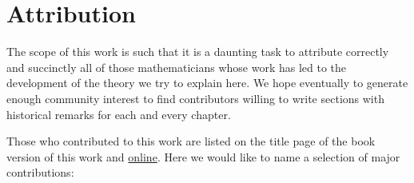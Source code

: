 \section{Attribution}
\label{section-attribution}

\noindent
The scope of this work is such that it is a daunting task to attribute
correctly and succinctly all of those mathematicians whose work has led
to the development of the theory we try to explain here. We hope eventually
to generate enough community interest to find contributors willing to write
sections with historical remarks for each and every chapter.

\medskip\noindent
Those who contributed to this work are listed on the title page of the book
version of this work and
\href{https://stacks.math.columbia.edu/tex/CONTRIBUTORS}{online}.
Here we would like to name a selection of major contributions:
